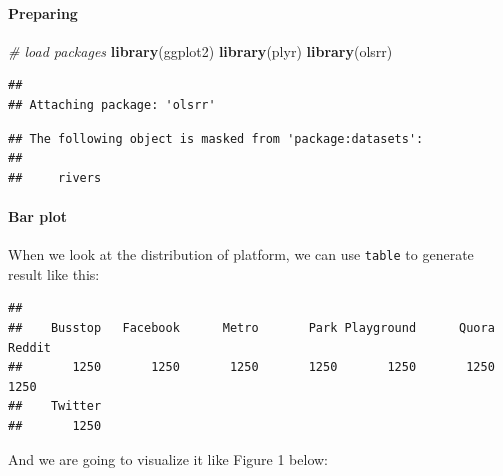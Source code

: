 \documentclass[
]{article}
\newenvironment{Shaded}{\begin{snugshade}}{\end{snugshade}}
\newcommand{\CommentTok}[1]{\textcolor[rgb]{0.56,0.35,0.01}{\textit{#1}}}
\newcommand{\KeywordTok}[1]{\textcolor[rgb]{0.13,0.29,0.53}{\textbf{#1}}}
\newcommand{\NormalTok}[1]{#1}
\newcommand{\OperatorTok}[1]{\textcolor[rgb]{0.81,0.36,0.00}{\textbf{#1}}}
\begin{document}
\hypertarget{preparing}{%
\paragraph{Preparing}\label{preparing}}

\begin{Shaded}
\begin{Highlighting}[]
\CommentTok{# load packages}
\KeywordTok{library}\NormalTok{(ggplot2)}
\KeywordTok{library}\NormalTok{(plyr)}
\KeywordTok{library}\NormalTok{(olsrr)}
\end{Highlighting}
\end{Shaded}

\begin{verbatim}
## 
## Attaching package: 'olsrr'
\end{verbatim}

\begin{verbatim}
## The following object is masked from 'package:datasets':
## 
##     rivers
\end{verbatim}

\hypertarget{bar-plot}{%
\paragraph{Bar plot}\label{bar-plot}}

When we look at the distribution of platform, we can use \texttt{table}
to generate result like this:

\begin{Shaded}
\end{Shaded}

\begin{verbatim}
## 
##    Busstop   Facebook      Metro       Park Playground      Quora     Reddit 
##       1250       1250       1250       1250       1250       1250       1250 
##    Twitter 
##       1250
\end{verbatim}

And we are going to visualize it like Figure 1 below:
\end{document}
